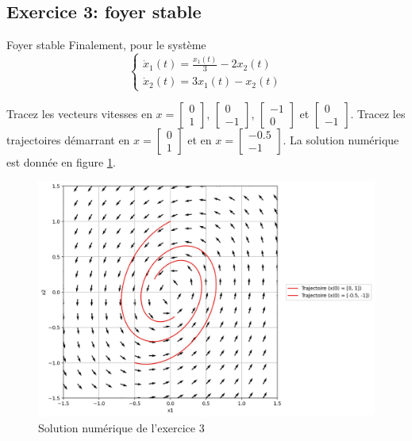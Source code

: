         \subsection{Exercice 3: foyer stable}
            \begin{exercise}{Foyer stable}
                Finalement, pour le système
                \begin{equation}
                    \begin{cases}
                        \dot{x}_1(t) = \frac{x_1(t)}{3} - 2 x_2(t)\\
                        \dot{x}_2(t) = 3 x_1(t) - x_2(t)
                    \end{cases}
                \end{equation}
            \end{exercise}
            Tracez les vecteurs vitesses en $x = \begin{bmatrix}0 \\ 1\end{bmatrix}$, $\begin{bmatrix}0 \\ -1\end{bmatrix}$, $\begin{bmatrix}-1 \\ 0\end{bmatrix}$ et $\begin{bmatrix}0 \\ -1\end{bmatrix}$. Tracez les trajectoires démarrant en $x = \begin{bmatrix}0 \\ 1\end{bmatrix}$ et en $x = \begin{bmatrix}-0.5 \\ -1\end{bmatrix}$.
            La solution numérique est donnée en figure \ref{fig:pdp_exercice_2_3}.
            \begin{figure}[ht!]
                \centering
                \includegraphics[width=\textwidth]{images/pdp_exercice_2_3.jpg}
                \caption{Solution numérique de l'exercice 3}
                \label{fig:pdp_exercice_2_3}
            \end{figure}
    
